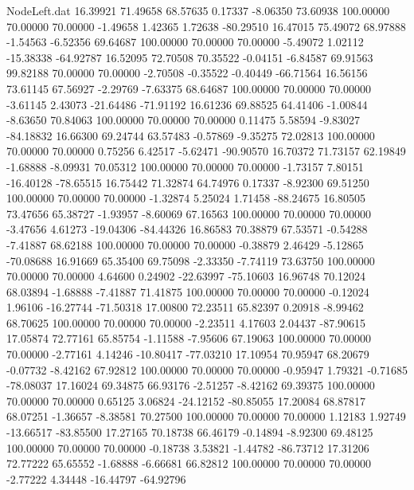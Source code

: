\begin{filecontents}{NodeLeft.dat}
  16.39921   71.49658   68.57635     0.17337   -8.06350   73.60938  100.00000   70.00000   70.00000   -1.49658    1.42365    1.72638  -80.29510
  16.47015   75.49072   68.97888    -1.54563   -6.52356   69.64687  100.00000   70.00000   70.00000   -5.49072    1.02112  -15.38338  -64.92787
  16.52095   72.70508   70.35522    -0.04151   -6.84587   69.91563   99.82188   70.00000   70.00000   -2.70508   -0.35522   -0.40449  -66.71564
  16.56156   73.61145   67.56927    -2.29769   -7.63375   68.64687  100.00000   70.00000   70.00000   -3.61145    2.43073  -21.64486  -71.91192
  16.61236   69.88525   64.41406    -1.00844   -8.63650   70.84063  100.00000   70.00000   70.00000    0.11475    5.58594   -9.83027  -84.18832
  16.66300   69.24744   63.57483    -0.57869   -9.35275   72.02813  100.00000   70.00000   70.00000    0.75256    6.42517   -5.62471  -90.90570
  16.70372   71.73157   62.19849    -1.68888   -8.09931   70.05312  100.00000   70.00000   70.00000   -1.73157    7.80151  -16.40128  -78.65515
  16.75442   71.32874   64.74976     0.17337   -8.92300   69.51250  100.00000   70.00000   70.00000   -1.32874    5.25024    1.71458  -88.24675
  16.80505   73.47656   65.38727    -1.93957   -8.60069   67.16563  100.00000   70.00000   70.00000   -3.47656    4.61273  -19.04306  -84.44326
  16.86583   70.38879   67.53571    -0.54288   -7.41887   68.62188  100.00000   70.00000   70.00000   -0.38879    2.46429   -5.12865  -70.08688
  16.91669   65.35400   69.75098    -2.33350   -7.74119   73.63750  100.00000   70.00000   70.00000    4.64600    0.24902  -22.63997  -75.10603
  16.96748   70.12024   68.03894    -1.68888   -7.41887   71.41875  100.00000   70.00000   70.00000   -0.12024    1.96106  -16.27744  -71.50318
  17.00800   72.23511   65.82397     0.20918   -8.99462   68.70625  100.00000   70.00000   70.00000   -2.23511    4.17603    2.04437  -87.90615
  17.05874   72.77161   65.85754    -1.11588   -7.95606   67.19063  100.00000   70.00000   70.00000   -2.77161    4.14246  -10.80417  -77.03210
  17.10954   70.95947   68.20679    -0.07732   -8.42162   67.92812  100.00000   70.00000   70.00000   -0.95947    1.79321   -0.71685  -78.08037
  17.16024   69.34875   66.93176    -2.51257   -8.42162   69.39375  100.00000   70.00000   70.00000    0.65125    3.06824  -24.12152  -80.85055
  17.20084   68.87817   68.07251    -1.36657   -8.38581   70.27500  100.00000   70.00000   70.00000    1.12183    1.92749  -13.66517  -83.85500
  17.27165   70.18738   66.46179    -0.14894   -8.92300   69.48125  100.00000   70.00000   70.00000   -0.18738    3.53821   -1.44782  -86.73712
  17.31206   72.77222   65.65552    -1.68888   -6.66681   66.82812  100.00000   70.00000   70.00000   -2.77222    4.34448  -16.44797  -64.92796

\end{filecontents}
